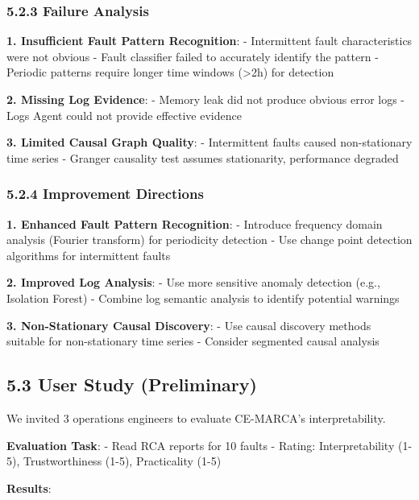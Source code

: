 \hypertarget{failure-analysis}{%
\subsubsection{5.2.3 Failure Analysis}\label{failure-analysis}}

\textbf{1. Insufficient Fault Pattern Recognition}: - Intermittent fault
characteristics were not obvious - Fault classifier failed to accurately
identify the pattern - Periodic patterns require longer time windows
(\textgreater2h) for detection

\textbf{2. Missing Log Evidence}: - Memory leak did not produce obvious
error logs - Logs Agent could not provide effective evidence

\textbf{3. Limited Causal Graph Quality}: - Intermittent faults caused
non-stationary time series - Granger causality test assumes
stationarity, performance degraded

\hypertarget{improvement-directions}{%
\subsubsection{5.2.4 Improvement
Directions}\label{improvement-directions}}

\textbf{1. Enhanced Fault Pattern Recognition}: - Introduce frequency
domain analysis (Fourier transform) for periodicity detection - Use
change point detection algorithms for intermittent faults

\textbf{2. Improved Log Analysis}: - Use more sensitive anomaly
detection (e.g., Isolation Forest) - Combine log semantic analysis to
identify potential warnings

\textbf{3. Non-Stationary Causal Discovery}: - Use causal discovery
methods suitable for non-stationary time series - Consider segmented
causal analysis

\hypertarget{user-study-preliminary}{%
\subsection{5.3 User Study (Preliminary)}\label{user-study-preliminary}}

We invited 3 operations engineers to evaluate CE-MARCA's
interpretability.

\textbf{Evaluation Task}: - Read RCA reports for 10 faults - Rating:
Interpretability (1-5), Trustworthiness (1-5), Practicality (1-5)

\textbf{Results}:

